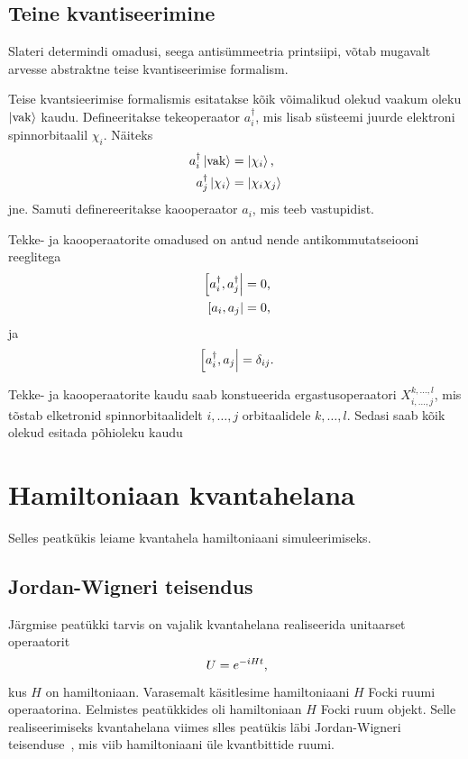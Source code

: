 \documentclass[12pt]{report}
\def\ket#1{\mathinner{|#1\rangle}}
\begin{document}
\section{Teine kvantiseerimine}\label{secquant}

Slateri determindi omadusi, seega antisümmeetria printsiipi, võtab mugavalt arvesse abstraktne teise kvantiseerimise formalism.

Teise kvantsieerimise formalismis esitatakse kõik võimalikud olekud vaakum oleku \(\ket{\mathrm{vak}}\) kaudu.
Defineeritakse tekeoperaator \(a_i^{\dagger}\), mis lisab süsteemi juurde elektroni spinnorbitaalil \(\chi_i\).
Näiteks
\begin{align}
    a_i^{\dagger}\ket{\mathrm{vak}} &= \ket{\chi_i}\rlap{,} \\
    a_j^{\dagger}\ket{\chi_i} & =\ket{\chi_i\chi_j}
\end{align}
jne.
Samuti definereeritakse kaooperaator \(a_i\), mis teeb vastupidist.

Tekke- ja kaooperaatorite omadused on antud nende antikommutatseiooni reeglitega
\begin{align}
    \left[a_i^{\dagger}, a_j^{\dagger}\right|&= 0\rlap{,} \\
    \left[a_i, a_j\right|&= 0\rlap{,}
\end{align}
ja
\begin{equation}
    \left[a_i^{\dagger}, a_j\right| = \delta_{ij}\rlap{.}
\end{equation}

Tekke- ja kaooperaatorite kaudu saab konstueerida ergastusoperaatori \(X_{i,\ldots, j}^{k,\ldots,l}\), mis tõstab elketronid spinnorbitaalidelt \(i,\ldots,j\) orbitaalidele \(k,\ldots, l\).
Sedasi saab kõik olekud esitada põhioleku kaudu~\cite{szabo+ostlnud}

\chapter{Hamiltoniaan kvantahelana}

Selles peatkükis leiame kvantahela hamiltoniaani simuleerimiseks.

\section{Jordan-Wigneri teisendus}

Järgmise peatükki tarvis on vajalik kvantahelana realiseerida unitaarset operaatorit
\begin{equation}\label{eq:hamtime}
  U = e^{-iHt}\rlap{,}
\end{equation}
kus \(H\) on hamiltoniaan.
Varasemalt käsitlesime hamiltoniaani \(H\) Focki ruumi operaatorina.
Eelmistes peatükkides oli hamiltoniaan \(H\) Focki ruum objekt.
Selle realiseerimiseks kvantahelana viimes slles peatükis läbi Jordan-Wigneri teisenduse~\cite{jordan+wigner}, mis viib hamiltoniaani üle kvantbittide ruumi.
\end{document}
